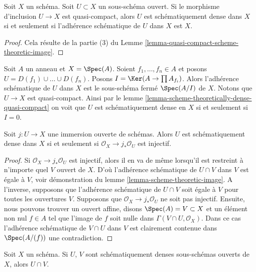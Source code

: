 \begin{lemma}
\label{lemma-scheme-theoretically-dense-quasi-compact}
Soit $X$ un schéma.
Soit $U \subset X$ un sous-schéma ouvert. Si le morphisme
d'inclusion $U \to X$ est quasi-compact, alors $U$ est schématiquement
dense dans $X$ si et seulement si l'adhérence schématique de $U$
dans $X$ est $X$.
\end{lemma}

\begin{proof}
Cela résulte de la partie (3) du Lemme \ref{lemma-quasi-compact-scheme-theoretic-image}.
\end{proof}

\begin{example}
\label{example-scheme-theoretic-closure}
Soit $A$ un anneau et $X = \Spec(A)$.
Soient $f_1, \ldots, f_n \in A$ et posons $U = D(f_1) \cup \ldots \cup D(f_n)$.
Posons $I = \Ker(A \to \prod A_{f_i})$. Alors l'adhérence schématique de $U$
dans $X$ est le sous-schéma fermé
$\Spec(A/I)$ de $X$. Notons que
$U \to X$ est quasi-compact. Ainsi par
le lemme \ref{lemma-scheme-theoretically-dense-quasi-compact} on voit que $U$ est schématiquement
dense en $X$ si et seulement si $I = 0$.
\end{example}

\begin{lemma}
\label{lemma-characterize-scheme-theoretically-dense}
Soit $j : U \to X$ une immersion ouverte de schémas.
Alors $U$ est schématiquement dense dans $X$
si et seulement si $\mathcal{O}_X \to j_*\mathcal{O}_U$ est injectif.
\end{lemma}

\begin{proof}
Si $\mathcal{O}_X \to j_*\mathcal{O}_U$ est injectif, alors il en va de même lorsqu'il
est restreint à n'importe quel $V$ ouvert de $X$.
D'où l'adhérence schématique de $U \cap V$ dans $V$
est égale à $V$, voir démonstration du lemme \ref{lemma-scheme-theoretic-image}.
A l'inverse, supposons que l'adhérence schématique
de $U \cap V$ soit égale à $V$ pour toutes les
ouvertures $V$. Supposons que $\mathcal{O}_X \to j_*\mathcal{O}_U$ ne soit pas injectif.
Ensuite, nous pouvons trouver un ouvert affine, disons $\Spec(A) = V \subset X$
et un élément non nul $f \in A$ tel que l'image de $f$ soit
nulle dans $\Gamma(V \cap U, \mathcal{O}_X)$. Dans ce cas l'adhérence schématique de $V \cap U$
dans $V$ est clairement contenue dans $\Spec(A/(f))$ une
contradiction.
\end{proof}

\begin{lemma}
\label{lemma-intersection-scheme-theoretically-dense}
Soit $X$ un schéma. Si $U$, $V$ sont schématiquement denses
sous-schémas ouverts de $X$, alors $U \cap V$.
\end{lemma}

